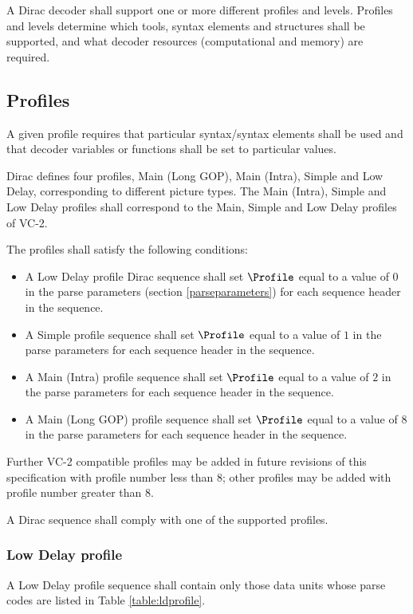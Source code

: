 \label{profilelevel}

A Dirac decoder shall support one or more different profiles and levels. 
Profiles and levels determine which tools, syntax elements and structures 
shall be supported, and what decoder resources (computational and memory) are required.

\subsection{Profiles}
\label{profiles}
A given profile requires that particular syntax/syntax elements shall 
be used and that decoder variables or functions shall be set to particular values.

Dirac defines four profiles, Main (Long GOP), Main (Intra), Simple and Low Delay, 
corresponding to different picture types. The Main (Intra), Simple and Low Delay
profiles shall correspond to the Main, Simple and Low Delay profiles of VC-2. 

The profiles shall satisfy the following conditions:
\begin{itemize}
\item A Low Delay profile Dirac sequence shall set $\Profile$ equal to a value of 
$0$ in the parse parameters (section \ref{parseparameters}) for each sequence header 
in the sequence.
\item A Simple profile sequence shall set $\Profile$ equal to a value of $1$ 
in the parse parameters for each sequence header in the sequence.
\item A Main (Intra) profile sequence shall set $\Profile$ equal to a value of $2$ 
in the parse parameters for each sequence header in the sequence.
\item A Main (Long GOP) profile sequence shall set $\Profile$ equal to a value of $8$ 
in the parse parameters for each sequence header in the sequence.
\end{itemize}

Further VC-2 compatible profiles may be added in future revisions of this 
specification with profile number less than 8; other profiles may be added with
profile number greater than 8.

A Dirac sequence shall comply with one of the supported profiles.

\subsubsection{Low Delay profile}

A Low Delay profile sequence shall contain only those data units whose 
parse codes are listed in Table \ref{table:ldprofile}.

